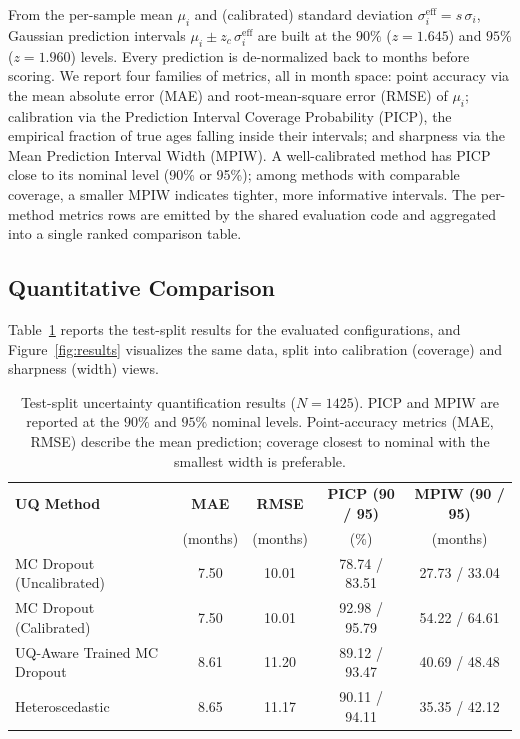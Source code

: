 From the per-sample mean $\mu_i$ and (calibrated) standard deviation
$\sigma_i^{\text{eff}} = s\,\sigma_i$, Gaussian prediction intervals
$\mu_i \pm z_c\,\sigma_i^{\text{eff}}$ are built at the $90\%$ ($z = 1.645$) and
$95\%$ ($z = 1.960$) levels. Every prediction is de-normalized back to months
before scoring. We report four families of metrics, all in month space:
point accuracy via the mean absolute error (MAE) and root-mean-square error
(RMSE) of $\mu_i$; calibration via the Prediction Interval Coverage Probability
(PICP), the empirical fraction of true ages falling inside their intervals; and
sharpness via the Mean Prediction Interval Width (MPIW). A well-calibrated
method has PICP close to its nominal level (90\% or 95\%); among methods with
comparable coverage, a smaller MPIW indicates tighter, more informative
intervals. The per-method metrics rows are emitted by the shared evaluation
code and aggregated into a single ranked comparison table.

\subsection{Quantitative Comparison}

Table~\ref{tab:results} reports the test-split results for the evaluated
configurations, and Figure~\ref{fig:results} visualizes the same data, split
into calibration (coverage) and sharpness (width) views.

\begin{table}[htbp]
  \centering
  \caption{Test-split uncertainty quantification results ($N = 1425$). PICP and
  MPIW are reported at the $90\%$ and $95\%$ nominal levels. Point-accuracy
  metrics (MAE, RMSE) describe the mean prediction; coverage closest to nominal
  with the smallest width is preferable.}
  \label{tab:results}
  \begin{tabular}{lcccc}
    \toprule
    \textbf{UQ Method} & \textbf{MAE} & \textbf{RMSE} & \textbf{PICP (90 / 95)} & \textbf{MPIW (90 / 95)} \\
                       & (months)     & (months)      & (\%)                     & (months) \\
    \midrule
    MC Dropout (Uncalibrated)    & 7.50 & 10.01 & 78.74 / 83.51 & 27.73 / 33.04 \\
    MC Dropout (Calibrated)      & 7.50 & 10.01 & 92.98 / 95.79 & 54.22 / 64.61 \\
    UQ-Aware Trained MC Dropout  & 8.61 & 11.20 & 89.12 / 93.47 & 40.69 / 48.48 \\
    Heteroscedastic              & 8.65 & 11.17 & 90.11 / 94.11 & 35.35 / 42.12 \\
    \bottomrule
  \end{tabular}
\end{table}

